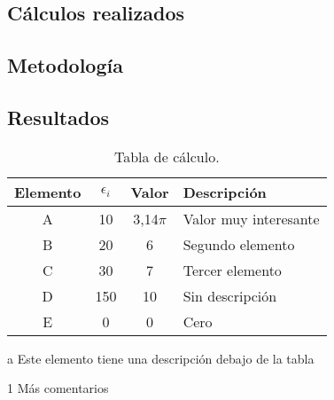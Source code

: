 \begin{appendixs}
	
	\section{Cálculos realizados}

	\subsection{Metodología}
	\lipsum[1-2]


	\subsection{Resultados}
	\lipsum[10]

	\enabletablerowcolor[2] %
	\begin{table}[H]
		\begin{threeparttable}
		\centering
		\caption{Tabla de cálculo.}
		\begin{tabular}{cccC{4cm}}
			\hline
			\textbf{Elemento} & $\epsilon_i$ & \textbf{Valor} & \textbf{Descripción} \bigstrut \\
			\hline
			A     & 10    & 3,14$\pi$ & Valor muy interesante \\
			B     & 20    & 6 & Segundo elemento \\
			C     & 30    & 7 & Tercer elemento \\
			D     & 150    & 10 & Sin descripción \\
			E     & 0    & 0 & Cero \\
			\hline
			\end{tabular}
		\begin{tablenotes}
			\item[a] Este elemento tiene una descripción debajo de la tabla
			\item[1] Más comentarios
		\end{tablenotes}
		\end{threeparttable}
		\label{tab:anexo-1}
	\end{table}
	\disabletablerowcolor %

\end{appendixs}